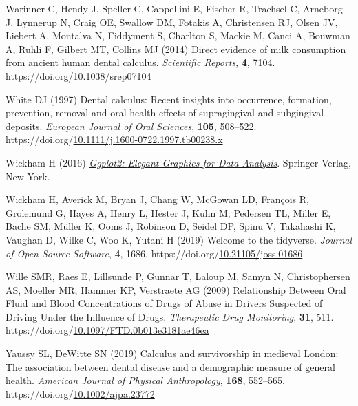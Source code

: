 \documentclass[
  11pt,
  leqno]{scrartcl}
\newlength{\cslhangindent}
\newenvironment{CSLReferences}[2] %
 {\begin{list}{}{%
  \setlength{\itemindent}{0pt}
  \setlength{\leftmargin}{0pt}
  \setlength{\parsep}{0pt}
  \ifodd #1
   \setlength{\leftmargin}{\cslhangindent}
   \setlength{\itemindent}{-1\cslhangindent}
  \fi
  \setlength{\itemsep}{#2\baselineskip}}}
 {\end{list}}
\begin{document}
\begin{CSLReferences}{1}{0}
Warinner C, Hendy J, Speller C, Cappellini E, Fischer R, Trachsel C,
Arneborg J, Lynnerup N, Craig OE, Swallow DM, Fotakis A, Christensen RJ,
Olsen JV, Liebert A, Montalva N, Fiddyment S, Charlton S, Mackie M,
Canci A, Bouwman A, Ruhli F, Gilbert MT, Collins MJ (2014) Direct
evidence of milk consumption from ancient human dental calculus.
\emph{Scientific Reports}, \textbf{4}, 7104.
https://doi.org/\href{https://doi.org/10.1038/srep07104}{10.1038/srep07104}

White DJ (1997) Dental calculus: Recent insights into occurrence,
formation, prevention, removal and oral health effects of supragingival
and subgingival deposits. \emph{European Journal of Oral Sciences},
\textbf{105}, 508--522.
https://doi.org/\href{https://doi.org/10.1111/j.1600-0722.1997.tb00238.x}{10.1111/j.1600-0722.1997.tb00238.x}

Wickham H (2016) \emph{\href{https://ggplot2.tidyverse.org}{Ggplot2:
{Elegant Graphics} for {Data Analysis}}}. {Springer-Verlag}, {New York}.

Wickham H, Averick M, Bryan J, Chang W, McGowan LD, François R,
Grolemund G, Hayes A, Henry L, Hester J, Kuhn M, Pedersen TL, Miller E,
Bache SM, Müller K, Ooms J, Robinson D, Seidel DP, Spinu V, Takahashi K,
Vaughan D, Wilke C, Woo K, Yutani H (2019) Welcome to the {tidyverse}.
\emph{Journal of Open Source Software}, \textbf{4}, 1686.
https://doi.org/\href{https://doi.org/10.21105/joss.01686}{10.21105/joss.01686}

Wille SMR, Raes E, Lillsunde P, Gunnar T, Laloup M, Samyn N,
Christophersen AS, Moeller MR, Hammer KP, Verstraete AG (2009)
Relationship {Between Oral Fluid} and {Blood Concentrations} of {Drugs}
of {Abuse} in {Drivers Suspected} of {Driving Under} the {Influence} of
{Drugs}. \emph{Therapeutic Drug Monitoring}, \textbf{31}, 511.
https://doi.org/\href{https://doi.org/10.1097/FTD.0b013e3181ae46ea}{10.1097/FTD.0b013e3181ae46ea}

Yaussy SL, DeWitte SN (2019) Calculus and survivorship in medieval
{London}: {The} association between dental disease and a demographic
measure of general health. \emph{American Journal of Physical
Anthropology}, \textbf{168}, 552--565.
https://doi.org/\href{https://doi.org/10.1002/ajpa.23772}{10.1002/ajpa.23772}


\end{CSLReferences}
\end{document}
